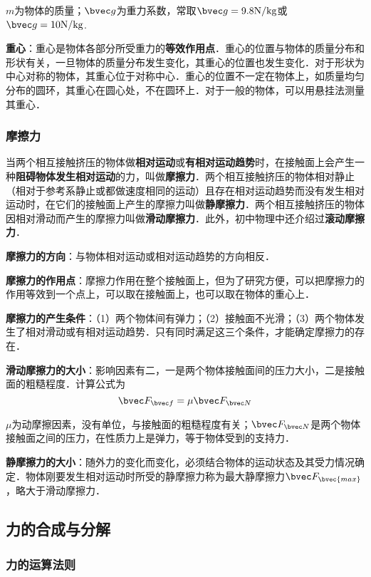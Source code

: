 $m$为物体的质量；$\bvec g$为重力系数，常取$\bvec g=9.8\mathrm{N/kg}$或$\bvec g=\mathrm{10N/kg}$.

\textbf{重心}：重心是物体各部分所受重力的\textbf{等效作用点}．重心的位置与物体的质量分布和形状有关，一旦物体的质量分布发生变化，其重心的位置也发生变化．对于形状为中心对称的物体，其重心位于对称中心．重心的位置不一定在物体上，如质量均匀分布的圆环，其重心在圆心处，不在圆环上．对于一般的物体，可以用悬挂法测量其重心．


\subsubsection{摩擦力}
当两个相互接触挤压的物体做\textbf{相对运动}或\textbf{有相对运动趋势}时，在接触面上会产生一种\textbf{阻碍物体发生相对运动}的力，叫做\textbf{摩擦力}．两个相互接触挤压的物体相对静止（相对于参考系静止或都做速度相同的运动）且存在相对运动趋势而没有发生相对运动时，在它们的接触面上产生的摩擦力叫做\textbf{静摩擦力}．两个相互接触挤压的物体因相对滑动而产生的摩擦力叫做\textbf{滑动摩擦力}．此外，初中物理中还介绍过\textbf{滚动摩擦力}．

\textbf{摩擦力的方向}：与物体相对运动或相对运动趋势的方向相反．

\textbf{摩擦力的作用点}：摩擦力作用在整个接触面上，但为了研究方便，可以把摩擦力的作用等效到一个点上，可以取在接触面上，也可以取在物体的重心上．

\textbf{摩擦力的产生条件}：（1）两个物体间有弹力；（2）接触面不光滑；（3）两个物体发生了相对滑动或有相对运动趋势．只有同时满足这三个条件，才能确定摩擦力的存在．

\textbf{滑动摩擦力的大小}：影响因素有二，一是两个物体接触面间的压力大小，二是接触面的粗糙程度．计算公式为
\begin{equation}
\bvec F_{\bvec f}=\mu \bvec F_{\bvec N}
\end{equation}

$\mu$为动摩擦因素，没有单位，与接触面的粗糙程度有关；$\bvec F_{\bvec N}$是两个物体接触面之间的压力，在性质力上是弹力，等于物体受到的支持力．

\textbf{静摩擦力的大小}：随外力的变化而变化，必须结合物体的运动状态及其受力情况确定．物体刚要发生相对运动时所受的静摩擦力称为最大静摩擦力$\bvec F_\bvec{max}$，略大于滑动摩擦力．

\subsection{力的合成与分解}
\subsubsection{力的运算法则}

